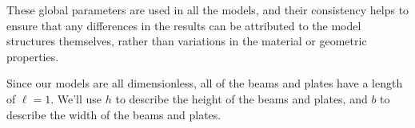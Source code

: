 \documentclass[../../main.tex]{subfiles}
\begin{document}
These global parameters are used in all the models, and their consistency helps to ensure that any differences in the results can be attributed to the model structures themselves, rather than variations in the material or geometric properties.

Since our models are all dimensionless, all of the beams and plates have a length of $\ell = 1$. We'll use $h$ to describe the height of the beams and plates, and $b$ to describe the width of the beams and plates.
\end{document}
